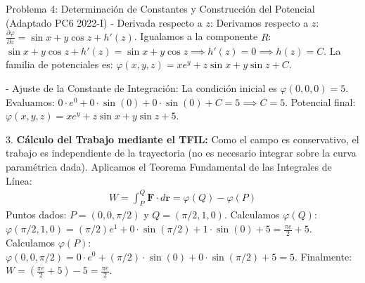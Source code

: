 \documentclass[11pt,a4paper]{article}
\begin{document}
\begin{ejerciciobox}{Problema 4: Determinación de Constantes y Construcción del Potencial (Adaptado PC6 2022-I)}
- Derivada respecto a $z$:
  Derivamos respecto a $z$:
  $\frac{\partial \varphi}{\partial z} = \sin x + y\cos z + h'(z)$.
  Igualamos a la componente $R$:
  $\sin x + y\cos z + h'(z) = \sin x + y\cos z \implies h'(z) = 0 \implies h(z) = C$.
  La familia de potenciales es: $\varphi(x,y,z) = x e^y + z\sin x + y\sin z + C$.

- Ajuste de la Constante de Integración:
  La condición inicial es $\varphi(0,0,0) = 5$.
  Evaluamos: $0\cdot e^0 + 0\cdot\sin(0) + 0\cdot\sin(0) + C = 5 \implies C = 5$.
  Potencial final: $\varphi(x,y,z) = x e^y + z\sin x + y\sin z + 5$.

3. \textbf{Cálculo del Trabajo mediante el TFIL:}
Como el campo es conservativo, el trabajo es independiente de la trayectoria (no es necesario integrar sobre la curva paramétrica dada). Aplicamos el Teorema Fundamental de las Integrales de Línea:
\begin{align*}
W = \int_{P}^{Q} \mathbf{F} \cdot d\mathbf{r} = \varphi(Q) - \varphi(P)
\end{align*}
Puntos dados: $P = (0, 0, \pi/2)$ y $Q = (\pi/2, 1, 0)$.
Calculamos $\varphi(Q)$:
$\varphi(\pi/2, 1, 0) = (\pi/2)e^1 + 0\cdot\sin(\pi/2) + 1\cdot\sin(0) + 5 = \frac{\pi e}{2} + 5$.
Calculamos $\varphi(P)$:
$\varphi(0, 0, \pi/2) = 0\cdot e^0 + (\pi/2)\cdot\sin(0) + 0\cdot\sin(\pi/2) + 5 = 5$.
Finalmente:
$W = \left(\frac{\pi e}{2} + 5\right) - 5 = \frac{\pi e}{2}$.

\end{ejerciciobox}
\end{document}
